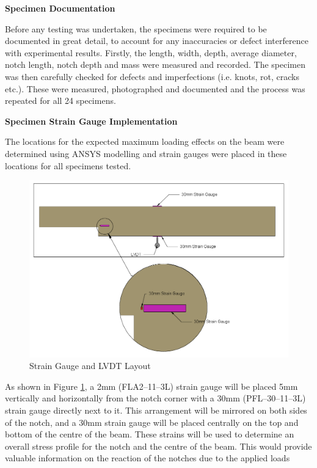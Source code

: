 \documentclass[11pt,a4paper]{article}
\numberwithin{equation}{subsection}
\begin{document}
\noindent
\textbf{Specimen Documentation}\par
\noindent
Before any testing was undertaken, the specimens were required to be documented in great detail, to account for any inaccuracies or defect interference with experimental results. Firstly, the length, width, depth, average diameter, notch length, notch depth and mass were measured and recorded. The specimen was then carefully checked for defects and imperfections (i.e. knots, rot, cracks etc.). These were measured, photographed and documented and the process was repeated for all 24 specimens. 

\vspace*{\baselineskip}

\noindent
\textbf{Specimen Strain Gauge Implementation}\par
\noindent
The locations for the expected maximum loading effects on the beam were determined using ANSYS modelling and strain gauges were placed in these locations for all specimens tested.

\begin{figure}[h]
	\begin{center}
		\includegraphics[scale=0.4]{Gauge_Set_Up}
	\end{center}
	\caption{Strain Gauge and LVDT Layout}
	\label{fig:Gauge}
\end{figure}

\noindent
As shown in Figure \ref{fig:Gauge}, a 2mm (FLA2--11--3L) strain gauge will be placed 5mm vertically and horizontally from the notch corner with a 30mm (PFL--30--11--3L) strain gauge directly next to it. This arrangement will be mirrored on both sides of the notch, and a 30mm strain gauge will be placed centrally on the top and bottom of the centre of the beam. These strains will be used to determine an overall stress profile for the notch and the centre of the beam. This would provide valuable information on the reaction of the notches due to the applied loads
\end{document}
